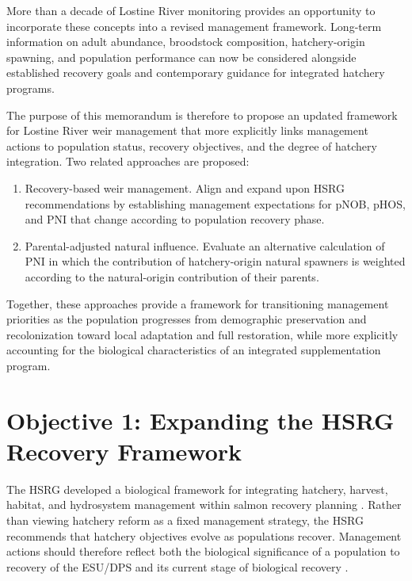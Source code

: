 \documentclass[12pt,letterpaper]{article}
\providecommand{\tightlist}{%
  \setlength{\itemsep}{0pt}\setlength{\parskip}{0pt}}
\begin{document}
More than a decade of Lostine River monitoring provides an opportunity to incorporate these concepts into a revised management framework. Long-term information on adult abundance, broodstock composition, hatchery-origin spawning, and population performance can now be considered alongside established recovery goals and contemporary guidance for integrated hatchery programs.

The purpose of this memorandum is therefore to propose an updated framework for Lostine River weir management that more explicitly links management actions to population status, recovery objectives, and the degree of hatchery integration. Two related approaches are proposed:

\begin{enumerate}
\def\labelenumi{\arabic{enumi}.}
\tightlist
\item
  Recovery-based weir management. Align and expand upon HSRG recommendations by establishing management expectations for pNOB, pHOS, and PNI that change according to population recovery phase.
\item
  Parental-adjusted natural influence. Evaluate an alternative calculation of PNI in which the contribution of hatchery-origin natural spawners is weighted according to the natural-origin contribution of their parents.
\end{enumerate}

Together, these approaches provide a framework for transitioning management priorities as the population progresses from demographic preservation and recolonization toward local adaptation and full restoration, while more explicitly accounting for the biological characteristics of an integrated supplementation program.

\section{Objective 1: Expanding the HSRG Recovery Framework}\label{objective-1-expanding-the-hsrg-recovery-framework}

The HSRG developed a biological framework for integrating hatchery, harvest, habitat, and hydrosystem management within salmon recovery planning \autocite{hsrg_implementation_2017}. Rather than viewing hatchery reform as a fixed management strategy, the HSRG recommends that hatchery objectives evolve as populations recover. Management actions should therefore reflect both the biological significance of a population to recovery of the ESU/DPS and its current stage of biological recovery \autocite{hsrg_implementation_2017}.
\end{document}
